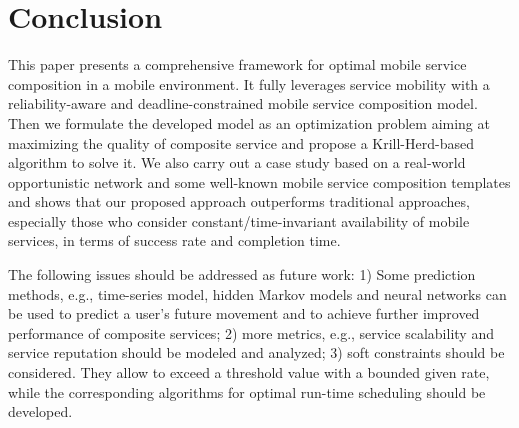 \documentclass[journal]{IEEEtran}
\begin{document}
\section{Conclusion}
This paper presents a comprehensive framework for optimal mobile service composition in a mobile environment. It fully leverages service mobility with a reliability-aware and deadline-constrained mobile service composition model. Then we formulate the developed model as an optimization problem aiming at maximizing the quality of composite service and propose a Krill-Herd-based algorithm to solve it. We also carry out a case study based on a real-world opportunistic network and some well-known mobile service composition templates and shows that our proposed approach outperforms traditional approaches, especially those who consider constant/time-invariant availability of mobile services, in terms of success rate and completion time.

The following issues should be addressed as future work: 1) Some prediction methods, e.g., time-series model, hidden Markov models and neural networks can be used to predict a user's future movement and to achieve further improved performance of composite services; 2) more metrics, e.g., service scalability and service reputation should be modeled and  analyzed; 3) soft constraints should be considered. They allow to exceed a threshold value with a bounded given rate, while the corresponding algorithms for optimal run-time scheduling should be developed.



\ifCLASSOPTIONcaptionsoff
  \newpage
\fi






\end{document}
